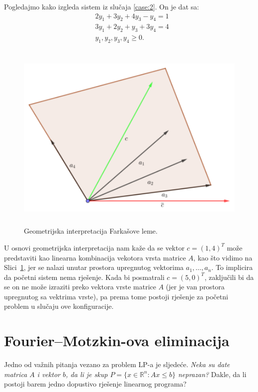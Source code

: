 \documentclass[a4paper, utf8, 11pt, colorlinks]{book}
\begin{document}
Pogledajmo kako izgleda sistem iz slučaja \ref{case:2}. On je dat sa:
\begin{align*}
	&2 y_1 + 3 y_2 + 4 y_3 - y_4 = 1\\
	&3y_1 + 2 y_2 + y_3 + 3 y_4 = 4 \\
	& y_1, y_2, y_3, y_4 \geq 0. 
\end{align*}
\begin{figure}[!ht]
	\centering
	\includegraphics[width=350pt, height=260pt]{farkas-geometry.eps}
	\vspace{-1cm}
	\caption{Geometrijska interpretacija Farkašove leme.}
	\label{fig:farkas-slika}
\end{figure}
U osnovi geometrijska interpretacija nam kaže da se vektor $c =(1,4)^T$ može predstaviti kao linearna kombinacija vekotora vrsta matrice $A$, kao što vidimo na Slici~\ref{fig:farkas-slika}, jer se nalazi unutar prostora upregnutog   vektorima $a_1, \ldots, a_n$.  To implicira da početni sistem nema rješenje. 
Kada bi posmatrali $c=(5,0)^T$, zaključili bi da se on ne može izraziti preko vektora vrste matrice $A$ (jer je van prostora upregnutog sa vektrima vrste), pa prema tome postoji rješenje za početni problem u slučaju ove konfiguracije.  

\section{Fourier–Motzkin-ova eliminacija}
Jedno od važnih pitanja vezano za problem  LP-a je sljedeće. 
\emph{Neka su date matrica $A$ i vektor $b$, da li je skup $P = \{x \in \mathbb{R}^n \colon A x \leq b\}$ neprazan?} Dakle, da li postoji barem jedno dopustivo rješenje linearnog programa? 
\end{document}
